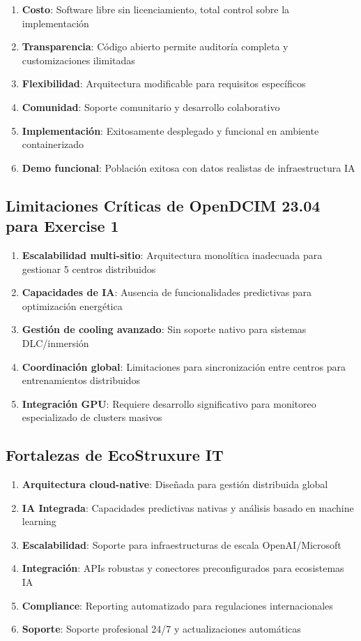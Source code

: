 \documentclass[12pt,a4paper]{article}
\begin{document}
\begin{enumerate}
    \item \textbf{Costo}: Software libre sin licenciamiento, total control sobre la implementación
    \item \textbf{Transparencia}: Código abierto permite auditoría completa y customizaciones ilimitadas
    \item \textbf{Flexibilidad}: Arquitectura modificable para requisitos específicos
    \item \textbf{Comunidad}: Soporte comunitario y desarrollo colaborativo
    \item \textbf{Implementación}: Exitosamente desplegado y funcional en ambiente containerizado
    \item \textbf{Demo funcional}: Población exitosa con datos realistas de infraestructura IA
\end{enumerate}

\subsection{Limitaciones Críticas de OpenDCIM 23.04 para Exercise 1}

\begin{enumerate}
    \item \textbf{Escalabilidad multi-sitio}: Arquitectura monolítica inadecuada para gestionar 5 centros distribuidos
    \item \textbf{Capacidades de IA}: Ausencia de funcionalidades predictivas para optimización energética
    \item \textbf{Gestión de cooling avanzado}: Sin soporte nativo para sistemas DLC/inmersión
    \item \textbf{Coordinación global}: Limitaciones para sincronización entre centros para entrenamientos distribuidos
    \item \textbf{Integración GPU}: Requiere desarrollo significativo para monitoreo especializado de clusters masivos
\end{enumerate}

\subsection{Fortalezas de EcoStruxure IT}

\begin{enumerate}
    \item \textbf{Arquitectura cloud-native}: Diseñada para gestión distribuida global
    \item \textbf{IA Integrada}: Capacidades predictivas nativas y análisis basado en machine learning
    \item \textbf{Escalabilidad}: Soporte para infraestructuras de escala OpenAI/Microsoft
    \item \textbf{Integración}: APIs robustas y conectores preconfigurados para ecosistemas IA
    \item \textbf{Compliance}: Reporting automatizado para regulaciones internacionales
    \item \textbf{Soporte}: Soporte profesional 24/7 y actualizaciones automáticas
\end{enumerate}
\end{document}
